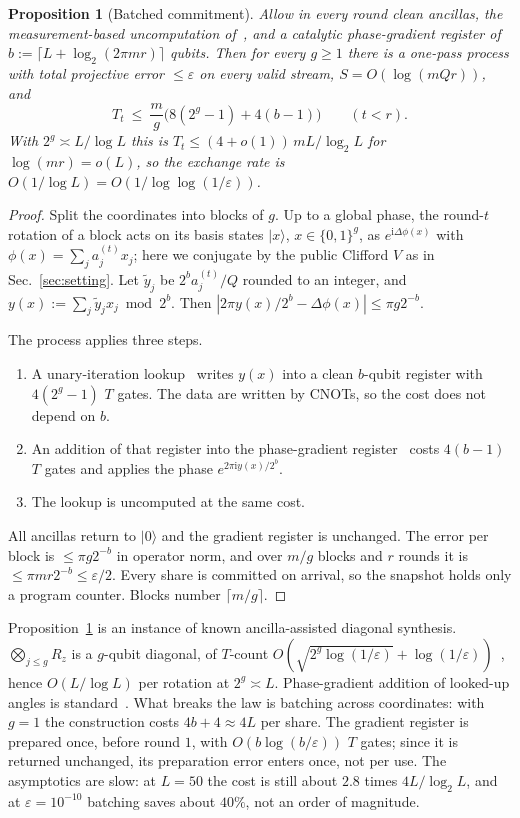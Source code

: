 \documentclass[aps,prx,twocolumn,superscriptaddress,nofootinbib,longbibliography]{revtex4-2}
\theoremstyle{plain}
\newtheorem{proposition}{Proposition}
\theoremstyle{definition}
\theoremstyle{remark}
\begin{document}
\begin{proposition}[Batched commitment]\label{prop:batch}
Allow in every round clean ancillas, the measurement-based uncomputation of~\cite{Gidney}, and a catalytic phase-gradient register of $b:=\lceil L+\log_2(2\pi mr)\rceil$ qubits. Then for every $g\ge1$ there is a one-pass process with total projective error $\le\varepsilon$ on every valid stream, $S=O(\log(mQr))$, and
\[
T_t\ \le\ \frac mg\big(8(2^g-1)+4(b-1)\big)\qquad(t<r).
\]
With $2^g\asymp L/\log L$ this is $T_t\le(4+o(1))\,mL/\log_2L$ for $\log(mr)=o(L)$, so the exchange rate is $O(1/\log L)=O(1/\log\log(1/\varepsilon))$.
\end{proposition}
\begin{proof}
Split the coordinates into blocks of $g$. Up to a global phase, the round-$t$ rotation of a block acts on its basis states $|x\rangle$, $x\in\{0,1\}^g$, as $e^{\mathrm i\Delta\phi(x)}$ with $\phi(x)=\sum_{j}a^{(t)}_jx_j$; here we conjugate by the public Clifford $V$ as in Sec.~\ref{sec:setting}. Let $\tilde y_j$ be $2^ba^{(t)}_j/Q$ rounded to an integer, and $y(x):=\sum_j\tilde y_jx_j\bmod2^b$. Then $|2\pi y(x)/2^b-\Delta\phi(x)|\le\pi g2^{-b}$.

The process applies three steps.
\begin{enumerate}\setlength\itemsep{0pt}
\item A unary-iteration lookup~\cite{Babbush} writes $y(x)$ into a clean $b$-qubit register with $4(2^g-1)$ $T$ gates. The data are written by CNOTs, so the cost does not depend on $b$.
\item An addition of that register into the phase-gradient register~\cite{Gidney} costs $4(b-1)$ $T$ gates and applies the phase $e^{2\pi\mathrm iy(x)/2^b}$.
\item The lookup is uncomputed at the same cost.
\end{enumerate}
All ancillas return to $|0\rangle$ and the gradient register is unchanged. The error per block is $\le\pi g2^{-b}$ in operator norm, and over $m/g$ blocks and $r$ rounds it is $\le\pi mr2^{-b}\le\varepsilon/2$. Every share is committed on arrival, so the snapshot holds only a program counter. Blocks number $\lceil m/g\rceil$.
\end{proof}
Proposition~\ref{prop:batch} is an instance of known ancilla-assisted diagonal synthesis. $\bigotimes_{j\le g}R_z$ is a $g$-qubit diagonal, of $T$-count $O(\sqrt{2^g\log(1/\varepsilon)}+\log(1/\varepsilon))$~\cite{LKS,GKW}, hence $O(L/\log L)$ per rotation at $2^g\asymp L$. Phase-gradient addition of looked-up angles is standard~\cite{Gidney,Sanders}. What breaks the law is batching across coordinates: with $g=1$ the construction costs $4b+4\approx4L$ per share. The gradient register is prepared once, before round $1$, with $O(b\log(b/\varepsilon))$ $T$ gates; since it is returned unchanged, its preparation error enters once, not per use. The asymptotics are slow: at $L=50$ the cost is still about $2.8$ times $4L/\log_2L$, and at $\varepsilon=10^{-10}$ batching saves about $40\%$, not an order of magnitude.
\end{document}
